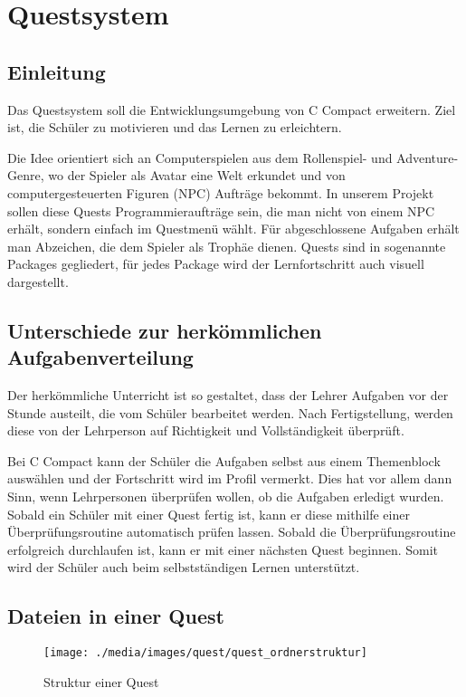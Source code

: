 \chapter{Questsystem}
\label{sec:quest}

\section{Einleitung}
Das Questsystem soll die Entwicklungsumgebung von C Compact  erweitern. Ziel ist, die Schüler zu motivieren und das Lernen zu erleichtern.

Die Idee orientiert sich an Computerspielen aus dem Rollenspiel- und Adventure-Genre, wo der Spieler als Avatar eine Welt erkundet und von computergesteuerten Figuren (NPC) Aufträge bekommt. In unserem Projekt sollen diese Quests Programmieraufträge sein, die man nicht von einem NPC erhält, sondern einfach im Questmenü wählt. Für abgeschlossene Aufgaben erhält man Abzeichen, die dem Spieler als Trophäe dienen. Quests sind in sogenannte Packages gegliedert, für jedes Package wird der Lernfortschritt auch visuell dargestellt.

\section{Unterschiede zur herkömmlichen Aufgabenverteilung}
Der herkömmliche Unterricht ist so gestaltet, dass der Lehrer Aufgaben vor der Stunde austeilt, die vom Schüler bearbeitet werden. Nach Fertigstellung, werden diese von der Lehrperson auf Richtigkeit und Vollständigkeit überprüft.

Bei C Compact kann der Schüler die Aufgaben selbst aus einem Themenblock auswählen und der Fortschritt wird im Profil vermerkt. Dies hat vor allem dann Sinn, wenn Lehrpersonen überprüfen wollen, ob die Aufgaben erledigt wurden. Sobald ein Schüler mit einer Quest fertig ist, kann er diese mithilfe einer Überprüfungsroutine automatisch prüfen lassen. Sobald die Überprüfungsroutine erfolgreich durchlaufen ist, kann er mit einer nächsten Quest beginnen. Somit wird der Schüler auch beim selbstständigen Lernen unterstützt.

\section{Dateien in einer Quest}
\label{sec:dateien_in_einer_quest}
\begin{figure}[h] 
  \centering
     \texttt{[image: ./media/images/quest/quest\_ordnerstruktur]}
  \caption{Struktur einer Quest}
  \label{fig:struct_quest}
\end{figure}

